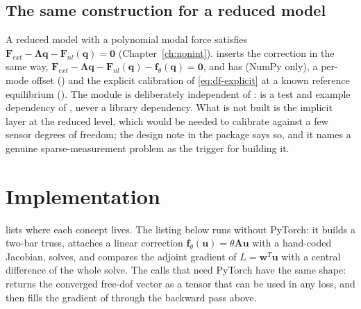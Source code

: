 \subsection{The same construction for a reduced model}\label{sec:df-rom}

A reduced model with a polynomial modal force satisfies $\bm F_{ext}-\bm\Lambda\bm q-\bm F_{nl}(\bm q)=\bm 0$ (Chapter~\ref{ch:nonint}). \rom{} inserts the correction in the same way, $\bm F_{ext}-\bm\Lambda\bm q-\bm F_{nl}(\bm q)-\bm f_\theta(\bm q)=\bm 0$, and has  (NumPy only), a per-mode offset () and the explicit calibration of \eqref{eq:df-explicit} at a known reference equilibrium (). The module is deliberately independent of \fea{}: \fea{} is a test and example dependency of \rom{}, never a library dependency. What is not built is the implicit layer at the reduced level, which would be needed to calibrate against a few sensor degrees of freedom; the design note in the package says so, and it names a genuine sparse-measurement problem as the trigger for building it.

\section{Implementation}\label{sec:df-impl}

 lists where each concept lives. The listing below runs without PyTorch: it builds a two-bar truss, attaches a linear correction $\bm f_\theta(\bm u)=\theta\bm A\bm u$ with a hand-coded Jacobian, solves, and compares the adjoint gradient of $L=\bm w^T\bm u$ with a central difference of the whole solve. The calls that need PyTorch have the same shape:  returns the converged free-dof vector as a tensor that can be used in any loss, and  then fills the gradient of  through the backward pass above.

